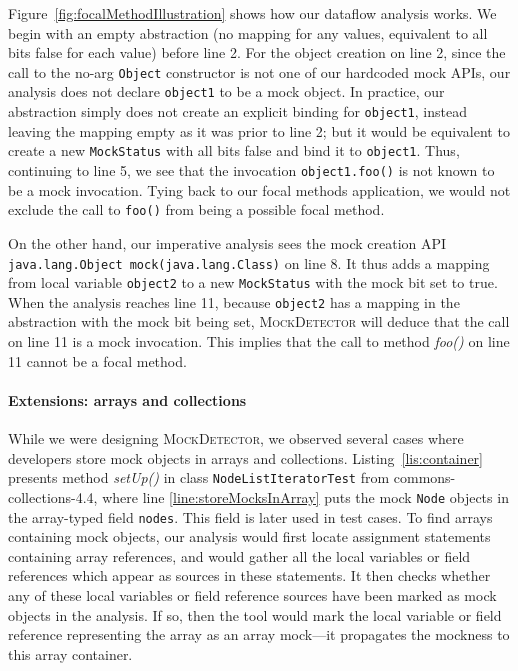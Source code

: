 Figure~\ref{fig:focalMethodIllustration} shows how our dataflow analysis works. We begin with an empty abstraction (no mapping for any values, equivalent to all bits false for each value) before line 2. For the object creation on line 2, since the call to the no-arg \texttt{Object} constructor is not one of our hardcoded mock APIs, our analysis does not declare \texttt{object1} to be a mock object. In practice, our abstraction simply does not create an explicit binding for \texttt{object1}, instead leaving the mapping empty as it was prior to line 2; but it would be equivalent to create a new \texttt{MockStatus} with all bits false and bind it to \texttt{object1}. Thus, continuing to line 5, we see that the invocation \texttt{object1.foo()} is not known to be a mock invocation. Tying back to our focal methods application, we would not exclude the call to \texttt{foo()} from being a possible focal method.

On the other hand, our imperative analysis sees the mock creation API \texttt{java.lang.Object mock(java.lang.Class)} on line 8. It thus adds a mapping from local variable \texttt{object2} to a new \texttt{MockStatus} with the mock bit set to true. When the analysis reaches line 11, because \texttt{object2} has a mapping in the abstraction with the mock bit being set, \textsc{MockDetector} will deduce that the call on line 11 is a mock invocation. This implies that the call to method \textit{foo()} on line 11 cannot be a focal method.

\paragraph{Extensions: arrays and collections} While we were designing \textsc{MockDetector}, we observed several cases where developers store mock objects in arrays and collections. Listing~\ref{lis:container} presents method \textit{setUp()} in class \texttt{NodeListIteratorTest} from commons-collections-4.4, where line \ref{line:storeMocksInArray} puts the mock \texttt{Node} objects in the array-typed field \texttt{nodes}. This field is later used in test cases. To find arrays containing mock objects, our analysis would first locate assignment statements containing array references, and would gather all the local variables or field references which appear as sources in these statements. It then checks whether any of these local variables or field reference sources have been marked as mock objects in the analysis. If so, then the tool would mark the local variable or field reference representing the array as an array mock---it propagates the mockness to this array container.

